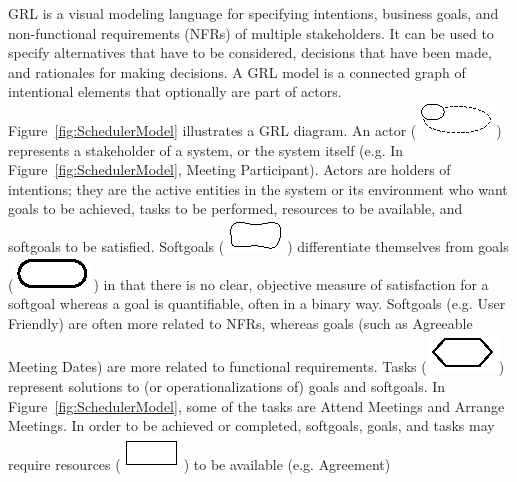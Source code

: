 \documentclass[11.5pt,two column]{llncs}
\begin{document}
GRL is a visual modeling language for specifying intentions, business goals, and non-functional requirements (NFRs) of multiple stakeholders. It can be used to specify alternatives that have to be considered, decisions that have been made, and rationales for making decisions. A GRL model is a connected graph of intentional elements that optionally are part of actors. Figure~\ref{fig:SchedulerModel} illustrates a GRL diagram. An actor (\includegraphics[scale=1]{img/actor}) represents a stakeholder of a system, or the system itself (e.g. In Figure~\ref{fig:SchedulerModel}, \textsf{Meeting Participant}). Actors are holders of intentions; they are the active entities in the system or its environment who want goals to be achieved, tasks to be performed, resources to be available, and softgoals to be satisfied. Softgoals (\includegraphics[scale=1]{img/softgoal}) differentiate themselves from goals (\includegraphics[scale=1]{img/goal}) in that there is no clear, objective measure of satisfaction for a softgoal whereas a goal is quantifiable, often in a binary way. Softgoals (e.g. \textsf{User Friendly)} are often more related to NFRs, whereas goals (such as \textsf{Agreeable Meeting Dates}) are more related to functional requirements. Tasks (\includegraphics[scale=1]{img/task}) represent solutions to (or operationalizations of) goals and softgoals. In Figure~\ref{fig:SchedulerModel}, some of the tasks are \textsf{Attend Meetings} and \textsf{Arrange Meetings}. In order to be achieved or completed, softgoals, goals, and tasks may require resources (\includegraphics[scale=1]{img/resource}) to be available (e.g. \textsf{Agreement})
\end{document}
